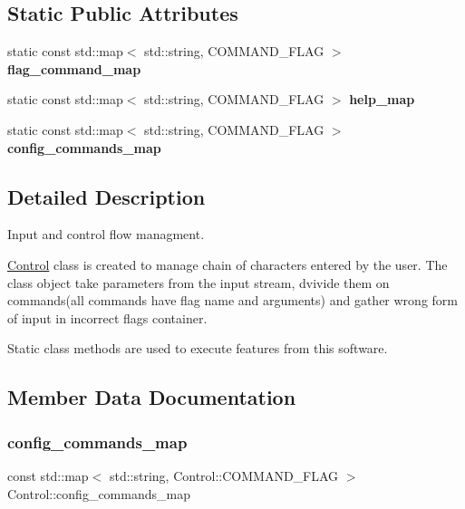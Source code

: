 \subsection*{Static Public Attributes}
\begin{DoxyCompactItemize}
\item 
static const std\+::map$<$ std\+::string, C\+O\+M\+M\+A\+N\+D\+\_\+\+F\+L\+AG $>$ {\bfseries flag\+\_\+command\+\_\+map}
\item 
static const std\+::map$<$ std\+::string, C\+O\+M\+M\+A\+N\+D\+\_\+\+F\+L\+AG $>$ {\bfseries help\+\_\+map}
\item 
static const std\+::map$<$ std\+::string, C\+O\+M\+M\+A\+N\+D\+\_\+\+F\+L\+AG $>$ {\bfseries config\+\_\+commands\+\_\+map}
\end{DoxyCompactItemize}


\subsection{Detailed Description}
Input and control flow managment. 

\mbox{\hyperlink{class_control}{Control}} class is created to manage chain of characters entered by the user. The class object take parameters from the input stream, dvivide them on commands(all commands have flag name and arguments) and gather wrong form of input in incorrect flags container.

Static class methods are used to execute features from this software. 

\subsection{Member Data Documentation}
\mbox{\label{class_control_a3d28ecb8f92493cf4f5c80a0de43057e}} 
\subsubsection{\texorpdfstring{config\+\_\+commands\+\_\+map}{config\_commands\_map}}
{\footnotesize\ttfamily const std\+::map$<$ std\+::string, Control\+::\+C\+O\+M\+M\+A\+N\+D\+\_\+\+F\+L\+AG $>$ Control\+::config\+\_\+commands\+\_\+map\hspace{0.3cm}{\ttfamily [static]}}

